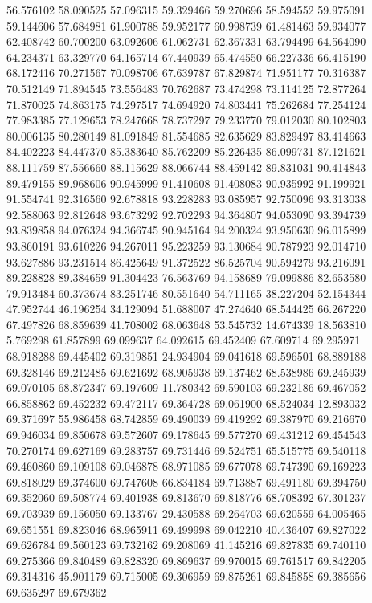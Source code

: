 56.576102
58.090525
57.096315
59.329466
59.270696
58.594552
59.975091
59.144606
57.684981
61.900788
59.952177
60.998739
61.481463
59.934077
62.408742
60.700200
63.092606
61.062731
62.367331
63.794499
64.564090
64.234371
63.329770
64.165714
67.440939
65.474550
66.227336
66.415190
68.172416
70.271567
70.098706
67.639787
67.829874
71.951177
70.316387
70.512149
71.894545
73.556483
70.762687
73.474298
73.114125
72.877264
71.870025
74.863175
74.297517
74.694920
74.803441
75.262684
77.254124
77.983385
77.129653
78.247668
78.737297
79.233770
79.012030
80.102803
80.006135
80.280149
81.091849
81.554685
82.635629
83.829497
83.414663
84.402223
84.447370
85.383640
85.762209
85.226435
86.099731
87.121621
88.111759
87.556660
88.115629
88.066744
88.459142
89.831031
90.414843
89.479155
89.968606
90.945999
91.410608
91.408083
90.935992
91.199921
91.554741
92.316560
92.678818
93.228283
93.085957
92.750096
93.313038
92.588063
92.812648
93.673292
92.702293
94.364807
94.053090
93.394739
93.839858
94.076324
94.366745
90.945164
94.200324
93.950630
96.015899
93.860191
93.610226
94.267011
95.223259
93.130684
90.787923
92.014710
93.627886
93.231514
86.425649
91.372522
86.525704
90.594279
93.216091
89.228828
89.384659
91.304423
76.563769
94.158689
79.099886
82.653580
79.913484
60.373674
83.251746
80.551640
54.711165
38.227204
52.154344
47.952744
46.196254
34.129094
51.688007
47.274640
68.544425
66.267220
67.497826
68.859639
41.708002
68.063648
53.545732
14.674339
18.563810
5.769298
61.857899
69.099637
64.092615
69.452409
67.609714
69.295971
68.918288
69.445402
69.319851
24.934904
69.041618
69.596501
68.889188
69.328146
69.212485
69.621692
68.905938
69.137462
68.538986
69.245939
69.070105
68.872347
69.197609
11.780342
69.590103
69.232186
69.467052
66.858862
69.452232
69.472117
69.364728
69.061900
68.524034
12.893032
69.371697
55.986458
68.742859
69.490039
69.419292
69.387970
69.216670
69.946034
69.850678
69.572607
69.178645
69.577270
69.431212
69.454543
70.270174
69.627169
69.283757
69.731446
69.524751
65.515775
69.540118
69.460860
69.109108
69.046878
68.971085
69.677078
69.747390
69.169223
69.818029
69.374600
69.747608
66.834184
69.713887
69.491180
69.394750
69.352060
69.508774
69.401938
69.813670
69.818776
68.708392
67.301237
69.703939
69.156050
69.133767
29.430588
69.264703
69.620559
64.005465
69.651551
69.823046
68.965911
69.499998
69.042210
40.436407
69.827022
69.626784
69.560123
69.732162
69.208069
41.145216
69.827835
69.740110
69.275366
69.840489
69.828320
69.869637
69.970015
69.761517
69.842205
69.314316
45.901179
69.715005
69.306959
69.875261
69.845858
69.385656
69.635297
69.679362
